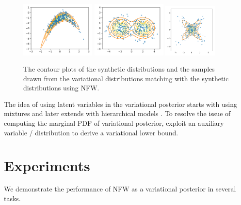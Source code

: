 \documentclass[twoside]{article}
\newcommand{\acr}[1]{\textsc{#1}\xspace}
\newcommand{\us}{\acr{NFW}}
\begin{document}
\begin{figure}[t]
\centering
\includegraphics[width=0.335\textwidth]{syn_func_1.pdf} 
\includegraphics[width=0.335\textwidth]{syn_func_2.pdf} 
\includegraphics[width=0.24\textwidth]{syn_func_3.pdf} 
\caption{The contour plots of the synthetic distributions and the samples drawn from the variational distributions matching with the synthetic distributions using \us. }\label{fig:syn_dist}
\end{figure}

The idea of using latent variables in the variational posterior starts with using mixtures \citep{BishopEtAl1998, GershmanEtAl2012, SalimansKnowles2013, GuoEtAl2016, MillerEtAl2017} and later extends with hierarchical models \citep{TranEtAl2015, RanganathEtAl2016, MaaloeEtAl2016}. To resolve the issue of computing the marginal PDF of variational posterior, \cite{AgakovBarber2004, RanganathEtAl2016, TranEtAl2015, MaaloeEtAl2016} exploit an auxiliary variable / distribution to derive a variational lower bound.

\section{Experiments}

We demonstrate the performance of \us as a variational posterior in several tasks. 
\end{document}
